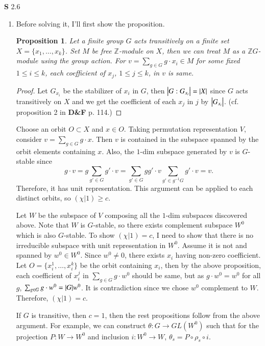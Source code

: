 \documentclass[a4paper, 12pt]{article}
\theoremstyle{Mydefinition}
\theoremstyle{Mytheorem}
\newtheorem{proposition}[statement]{Proposition}
\begin{document}
\noindent \textbf{S} 2.6
\begin{enumerate}
    \item Before solving it, I'll first show the proposition.
    \begin{proposition}
    Let a finite group $G$ acts transitively on a finite set $X = \{x_1, \ldots, x_k\}$. Set $M$ be free $\mathbb{Z}$-module on $X$, then we can treat $M$ as a $\mathbb{Z}G$-module using the group action. For $v = \sum_{g\in G}g\cdot x_i\in M$ for some fixed $1\leq i\leq k$, each coefficient of $x_j$, $1\leq j\leq k$, in $v$ is same.
    \end{proposition}
    \begin{proof}
    Let $G_{x_i}$ be the stabilizer of $x_i$ in $G$, then $\abs{G:G_{x_i}} = \abs{X}$ since $G$ acts transitively on $X$ and we get the coefficient of each $x_j$ in $j$ by $\abs{G_{x_i}}$. (cf. proposition 2 in \textbf{D\&F} p. 114.)
    \end{proof}
    Choose an orbit $O\subset X$ and $x\in O$. Taking permutation representation $V$, consider $v = \sum_{g\in G}g\cdot x$. Then $v$ is contained in the subspace spanned by the orbit elements containing $x$. Also, the $1$-dim subspace generated by $v$ is $G$-stable since 
    \begin{equation}
        g\cdot v = g\sum_{g'\in G}g'\cdot v=\sum_{g'\in G}gg'\cdot v \sum_{g'\in g^{-1}G}g'\cdot v= v.
    \end{equation}
    Therefore, it has unit representation. This argument can be applied to each distinct orbits, so $(\chi|1)\geq c$.
    
    Let $W$ be the subspace of $V$ composing all the $1$-dim subspaces discovered above. Note that $W$ is $G$-stable, so there exists complement subspace $W^0$ which is also $G$-stable. To show $(\chi|1) = c$, I need to show that there is no irreducible subspace with unit representation in $W^0$. Assume it is not and spanned by $w^0\in W^0$. Since $w^0\neq 0$, there exists $x_i$ having non-zero coefficient. Let $O=\{x^1_i, \ldots, x^k_i\}$ be the orbit containing $x_i$, then by the above proposition, each coefficient of $x^j_i$ in $\sum_{g\in G}g\cdot w^0$ should be same, but as $g\cdot w^0 = w^0$ for all $g$, $\sum_{g\in G}g\cdot w^0 = \abs{G}w^0$. It is contradiction since we chose $w^0$ complement to $W$. Therefore, $(\chi|1) = c$.
    
    If $G$ is transitive, then $c=1$, then the rest propositions follow from the above argument. For example, we can construct $\theta:G\rightarrow GL(W^0)$ such that for the projection $P:W\rightarrow W^0$ and inclusion $i:W^0\rightarrow W$, $\theta_s = P\circ \rho_s\circ i$.
    

\end{enumerate}
\end{document}
